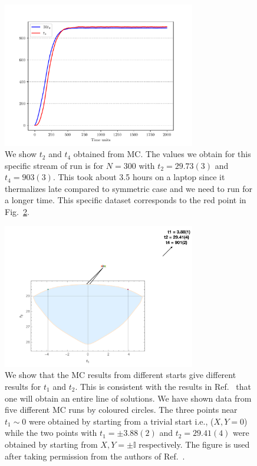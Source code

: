 \documentclass[letter,11pt]{article}
\begin{document}
\begin{figure}[htbp] 
	\centering 
	\includegraphics[width=0.75\textwidth]{figs/2MM_symb_t2_t4.pdf}
	\caption{\label{fig:2MM_t2t4}We show $t_{2}$ and $t_{4}$ obtained from MC. 
	The values we obtain for this specific stream of run is for $N=300$ with $t_{2} = 29.73(3)$ and $t_{4} = 903(3)$. This took about 3.5 hours on a laptop since it thermalizes late compared to symmetric case and we need to run for a longer time. This specific dataset corresponds to the red point in Fig.~\ref{fig:2MM_comp1}.} 
\end{figure}

\begin{figure}[h] 
	\centering 
	\includegraphics[width=0.75\textwidth]{figs/2MM_symb_ms.pdf}
	\caption{\label{fig:2MM_comp1}We show that the MC results from different starts give different results for $t_1$ and $t_2$. This is consistent with the results in Ref.~\cite{Kazakov:2021lel} that one will obtain an entire line of solutions. We have shown data from five different MC runs by coloured circles. The three points near $t_{1} \sim 0$ were obtained by starting from a trivial start i.e., ($X,Y = 0$) while the two points with $t_{1} = \pm 3.88(2)$ and $t_{2}=29.41(4)$ were obtained by starting from $X,Y = \pm \mathbb{I}$ respectively. The figure is used after taking permission from the authors of Ref.~\cite{Kazakov:2021lel}.}
\end{figure}
\end{document}
